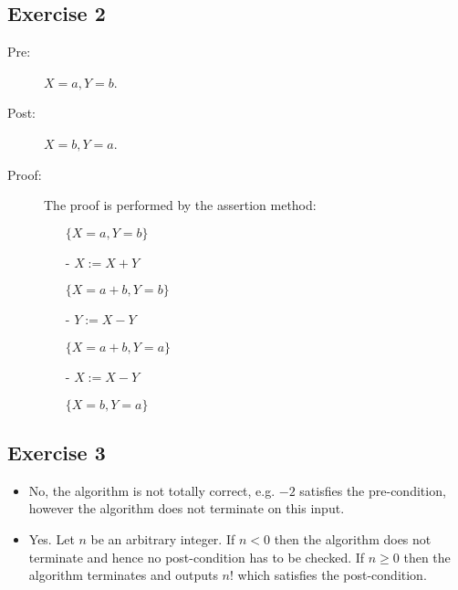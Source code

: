 \documentclass[english]{article}
\begin{document}
\newpage

\subsection*{Exercise 2}
\begin{description}
  \item[Pre:] $X=a,Y=b$.
  \item[Post:] $X=b,Y=a$.
  \item[Proof:] The proof is performed by the assertion method:
  \begin{itemize}
    \item[] \hspace{1cm} {\scriptsize $\{X=a,Y=b\}$}
	\item[-]$X:=X+Y$
	\item[]\hspace{1cm} {\scriptsize $\{X=a+b,Y=b\}$}
	\item[-]$Y:=X-Y$
	\item[]\hspace{1cm} {\scriptsize $\{X=a+b,Y=a\}$}
	\item[-]$X:=X-Y$
	\item[]\hspace{1cm} {\scriptsize $\{X=b,Y=a\}$}
  \end{itemize}
\end{description}

\subsection*{Exercise 3}
\begin{itemize}
\item No, the algorithm is not totally correct, e.g. $-2$ satisfies the 
pre-condition, however the algorithm does not terminate on this input.
\item Yes. Let $n$ be an arbitrary integer.
If $n<0$ then the algorithm does not terminate and hence no post-condition
has to be checked.
If $n\geq 0$ then the algorithm terminates and outputs $n!$ which satisfies
the post-condition.
\end{itemize}
\end{document}
